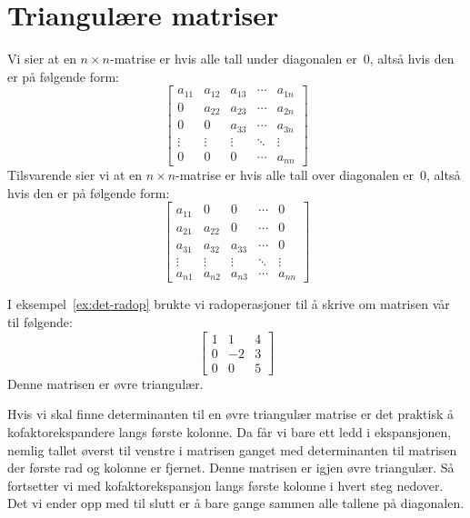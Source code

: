 \section*{Triangulære matriser}

Vi sier at en $n \times n$-matrise er  hvis
alle tall under diagonalen er~$0$, altså hvis den er på følgende form:
\[
\begin{bmatrix}
a_{11} & a_{12} & a_{13} & \cdots & a_{1n} \\
0      & a_{22} & a_{23} & \cdots & a_{2n} \\
0      & 0      & a_{33} & \cdots & a_{3n} \\
\vdots & \vdots & \vdots & \ddots & \vdots \\
0      & 0      & 0      & \cdots & a_{nn}
\end{bmatrix}
\]
Tilsvarende sier vi at en $n \times n$-matrise er  hvis alle tall over diagonalen er~$0$, altså hvis den
er på følgende form:
\[
\begin{bmatrix}
a_{11} & 0      & 0      & \cdots & 0      \\
a_{21} & a_{22} & 0      & \cdots & 0      \\
a_{31} & a_{32} & a_{33} & \cdots & 0      \\
\vdots & \vdots & \vdots & \ddots & \vdots \\
a_{n1} & a_{n2} & a_{n3} & \cdots & a_{nn}
\end{bmatrix}
\]

\begin{ex}
I eksempel~\ref{ex:det-radop} brukte vi radoperasjoner til å skrive om
matrisen vår til følgende:
\[
\begin{bmatrix}
1 &  1 &  4 \\
0 & -2 &  3 \\
0 &  0 &  5
\end{bmatrix}
\]
Denne matrisen er øvre triangulær.
\end{ex}

Hvis vi skal finne determinanten til en øvre triangulær matrise er det
praktisk å kofaktorekspandere langs første kolonne.  Da får vi bare
ett ledd i ekspansjonen, nemlig tallet øverst til venstre i matrisen
ganget med determinanten til matrisen der første rad og kolonne er
fjernet.  Denne matrisen er igjen øvre triangulær.  Så fortsetter vi
med kofaktorekspansjon langs første kolonne i hvert steg nedover.  Det
vi ender opp med til slutt er å bare gange sammen alle tallene på
diagonalen.

